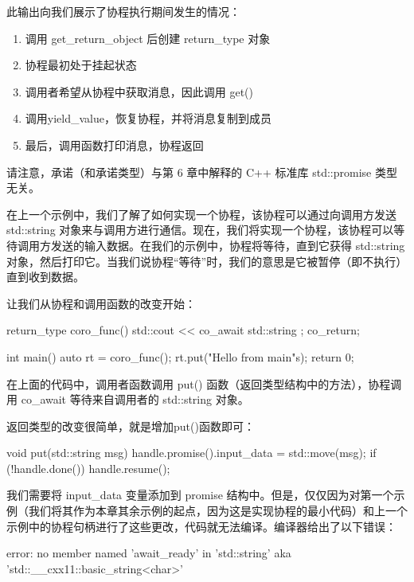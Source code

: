 此输出向我们展示了协程执行期间发生的情况：

\begin{enumerate}
\item
调用 get\_return\_object 后创建 return\_type 对象

\item
协程最初处于挂起状态

\item
调用者希望从协程中获取消息，因此调用 get()

\item
调用yield\_value，恢复协程，并将消息复制到成员

\item
最后，调用函数打印消息，协程返回
\end{enumerate}

请注意，承诺（和承诺类型）与第 6 章中解释的 C++ 标准库 std::promise 类型无关。


在上一个示例中，我们了解了如何实现一个协程，该协程可以通过向调用方发送 std::string 对象来与调用方进行通信。现在，我们将实现一个协程，该协程可以等待调用方发送的输入数据。在我们的示例中，协程将等待，直到它获得 std::string 对象，然后打印它。当我们说协程“等待”时，我们的意思是它被暂停（即不执行）直到收到数据。

让我们从协程和调用函数的改变开始：

\begin{cpp}
return_type coro_func() {
    std::cout << co_await std::string{ };
    co_return;
}

int main() {
    auto rt = coro_func();
    rt.put("Hello from main\n"s);
    return 0;
}
\end{cpp}

在上面的代码中，调用者函数调用 put() 函数（返回类型结构中的方法），协程调用 co\_await 等待来自调用者的 std::string 对象。

返回类型的改变很简单，就是增加put()函数即可：

\begin{cpp}
void put(std::string msg) {
    handle.promise().input_data = std::move(msg);
    if (!handle.done()) {
        handle.resume();
    }
}
\end{cpp}

我们需要将 input\_data 变量添加到 promise 结构中。但是，仅仅因为对第一个示例（我们将其作为本章其余示例的起点，因为这是实现协程的最小代码）和上一个示例中的协程句柄进行了这些更改，代码就无法编译。编译器给出了以下错误：

\begin{shell}
error: no member named 'await_ready' in 'std::string' {aka 'std::__cxx11::basic_string<char>'}
\end{shell}

